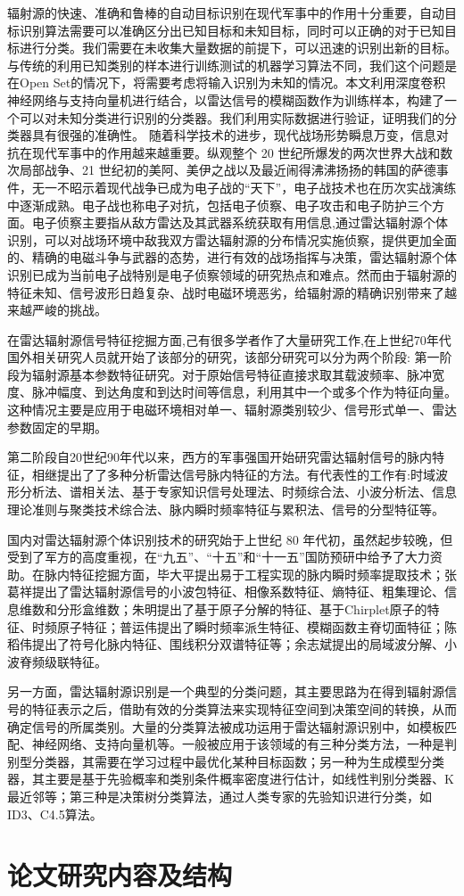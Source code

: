 辐射源的快速、准确和鲁棒的自动目标识别在现代军事中的作用十分重要，自动目标识别算法需要可以准确区分出已知目标和未知目标，同时可以正确的对于已知目标进行分类。我们需要在未收集大量数据的前提下，可以迅速的识别出新的目标。与传统的利用已知类别的样本进行训练测试的机器学习算法不同，我们这个问题是在Open Set的情况下，将需要考虑将输入识别为未知的情况。本文利用深度卷积神经网络与支持向量机进行结合，以雷达信号的模糊函数作为训练样本，构建了一个可以对未知分类进行识别的分类器。我们利用实际数据进行验证，证明我们的分类器具有很强的准确性。
随着科学技术的进步，现代战场形势瞬息万变，信息对抗在现代军事中的作用越来越重要。纵观整个 20 世纪所爆发的两次世界大战和数次局部战争、21 世纪初的美阿、美伊之战以及最近闹得沸沸扬扬的韩国的萨德事件，无一不昭示着现代战争已成为电子战的“天下”，电子战技术也在历次实战演练中逐渐成熟。电子战也称电子对抗，包括电子侦察、电子攻击和电子防护三个方面。电子侦察主要指从敌方雷达及其武器系统获取有用信息,通过雷达辐射源个体识别，可以对战场环境中敌我双方雷达辐射源的分布情况实施侦察，提供更加全面的、精确的电磁斗争与武器的态势，进行有效的战场指挥与决策，雷达辐射源个体识别已成为当前电子战特别是电子侦察领域的研究热点和难点。然而由于辐射源的特征未知、信号波形日趋复杂、战时电磁环境恶劣，给辐射源的精确识别带来了越来越严峻的挑战。

在雷达辐射源信号特征挖掘方面,己有很多学者作了大量研究工作,在上世纪70年代国外相关研究人员就开始了该部分的研究，该部分研究可以分为两个阶段:
第一阶段为辐射源基本参数特征研究。对于原始信号特征直接求取其载波频率、脉冲宽度、脉冲幅度、到达角度和到达时间等信息，利用其中一个或多个作为特征向量。这种情况主要是应用于电磁环境相对单一、辐射源类别较少、信号形式单一、雷达参数固定的早期。

第二阶段自20世纪90年代以来，西方的军事强国开始研究雷达辐射信号的脉内特征，相继提出了了多种分析雷达信号脉内特征的方法。有代表性的工作有:时域波形分析法、谱相关法、基于专家知识信号处理法、时频综合法、小波分析法、信息理论准则与聚类技术综合法、脉内瞬时频率特征与累积法、信号的分型特征等。

国内对雷达辐射源个体识别技术的研究始于上世纪 80 年代初，虽然起步较晚，但受到了军方的高度重视，在“九五”、“十五”和“十一五”国防预研中给予了大力资助。在脉内特征挖掘方面，毕大平提出易于工程实现的脉内瞬时频率提取技术；张葛祥提出了雷达辐射源信号的小波包特征、相像系数特征、熵特征、粗集理论、信息维数和分形盒维数；朱明提出了基于原子分解的特征、基于Chirplet原子的特征、时频原子特征；普运伟提出了瞬时频率派生特征、模糊函数主脊切面特征；陈稻伟提出了符号化脉内特征、围线积分双谱特征等；余志斌提出的局域波分解、小波脊频级联特征。

另一方面，雷达辐射源识别是一个典型的分类问题，其主要思路为在得到辐射源信号的特征表示之后，借助有效的分类算法来实现特征空间到决策空间的转换，从而确定信号的所属类别。大量的分类算法被成功运用于雷达辐射源识别中，如模板匹配、神经网络、支持向量机等。一般被应用于该领域的有三种分类方法，一种是判别型分类器，其需要在学习过程中最优化某种目标函数；另一种为生成模型分类器，其主要是基于先验概率和类别条件概率密度进行估计，如线性判别分类器、K最近邻等；第三种是决策树分类算法，通过人类专家的先验知识进行分类，如ID3、C4.5算法。

\section{论文研究内容及结构}
